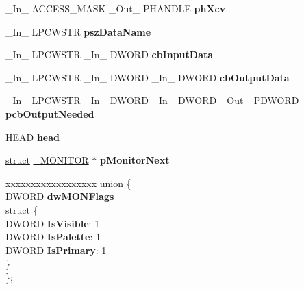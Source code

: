 \begin{DoxyCompactItemize}
\+\_\+\+In\+\_\+ A\+C\+C\+E\+S\+S\+\_\+\+M\+A\+SK \+\_\+\+Out\+\_\+ P\+H\+A\+N\+D\+LE {\bfseries ph\+Xcv}
\item 
\mbox{\label{struct___m_o_n_i_t_o_r_a2a8c4df68f768dbc36b748dc6aabaf19}} 
\+\_\+\+In\+\_\+ L\+P\+C\+W\+S\+TR {\bfseries psz\+Data\+Name}
\item 
\mbox{\label{struct___m_o_n_i_t_o_r_aa934a44c4e75f539463040099ce18c19}} 
\+\_\+\+In\+\_\+ L\+P\+C\+W\+S\+TR \+\_\+\+In\+\_\+ D\+W\+O\+RD {\bfseries cb\+Input\+Data}
\item 
\mbox{\label{struct___m_o_n_i_t_o_r_afa2e8f31e8c8ded02378afbeb0703ffa}} 
\+\_\+\+In\+\_\+ L\+P\+C\+W\+S\+TR \+\_\+\+In\+\_\+ D\+W\+O\+RD \+\_\+\+In\+\_\+ D\+W\+O\+RD {\bfseries cb\+Output\+Data}
\item 
\mbox{\label{struct___m_o_n_i_t_o_r_a39db1758628beb61b2c0dc79d863c511}} 
\+\_\+\+In\+\_\+ L\+P\+C\+W\+S\+TR \+\_\+\+In\+\_\+ D\+W\+O\+RD \+\_\+\+In\+\_\+ D\+W\+O\+RD \+\_\+\+Out\+\_\+ P\+D\+W\+O\+RD {\bfseries pcb\+Output\+Needed}
\item 
\mbox{\label{struct___m_o_n_i_t_o_r_aa3db0f5849f975217f4f6e58b5d4c13f}} 
\hyperlink{struct___h_e_a_d}{H\+E\+AD} {\bfseries head}
\item 
\mbox{\label{struct___m_o_n_i_t_o_r_ad1988975fd0b9c04f941d0b46bf299f5}} 
\hyperlink{interfacestruct}{struct} \hyperlink{struct___m_o_n_i_t_o_r}{\+\_\+\+M\+O\+N\+I\+T\+OR} $\ast$ {\bfseries p\+Monitor\+Next}
\item 
\mbox{\label{struct___m_o_n_i_t_o_r_a845c29039419cff685c44bb5d3080a15}} 
\begin{tabbing}
xx\=xx\=xx\=xx\=xx\=xx\=xx\=xx\=xx\=\kill
union \{\\
\>DWORD {\bfseries dwMONFlags}\\
\mbox{\label{union___m_o_n_i_t_o_r_1_1_0D3782_a2eec5a20adad56e7883b9075a202fb2b}} 
\>struct \{\\
\>\>DWORD {\bfseries IsVisible}: 1\\
\>\>DWORD {\bfseries IsPalette}: 1\\
\>\>DWORD {\bfseries IsPrimary}: 1\\
\>\} \\
\}; \\


\end{tabbing}
\end{DoxyCompactItemize}
